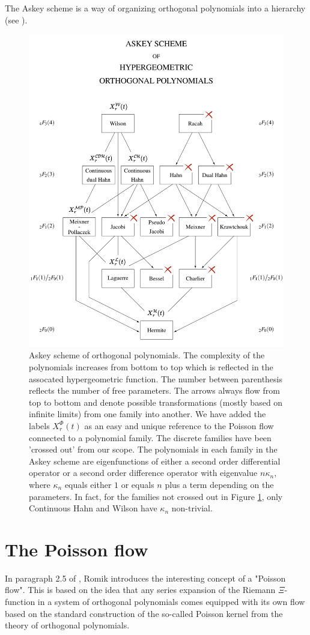 \documentclass[a4paper,11pt,twoside]{amsart}
\begin{document}
The Askey scheme is a way of organizing orthogonal polynomials into a hierarchy (see \cite{koe}).
\begin{figure}[H]
  \includegraphics[width=0.8\linewidth]{Askeyschemenew.jpeg}
  \caption{Askey scheme of orthogonal polynomials. The complexity of the polynomials increases from bottom to top which is reflected in the assocated hypergeometric function. The number between parenthesis reflects the number of free parameters. The arrows always flow from top to bottom and denote possible transformations (mostly based on infinite limits) from one family into another. We have added the labels $X_r^{\mathcal{\Phi}}(t)$ as an easy and unique reference to the Poisson flow connected to a polynomial family. The discrete families have been 'crossed out' from our scope. The polynomials in each family in the Askey scheme are eigenfunctions of either a second order differential operator or a second order difference operator with eigenvalue $n\kappa_n$, where $\kappa_n$ equals either $1$ or equals $n$ plus a term depending on the parameters. In fact, for the families not crossed out in Figure \ref{fig:askey}, only Continuous Hahn and Wilson have $\kappa_n$ non-trivial.}
  \label{fig:askey}
\end{figure}

\pagebreak
\section{The Poisson flow} \label{poissonflow}
In paragraph 2.5 of \cite{rom}, Romik introduces the interesting concept of a "Poisson flow". This is based on the idea that any series expansion of the Riemann $\Xi$-function in a system of orthogonal polynomials comes equipped with its own flow based on the standard construction of the so-called Poisson kernel from the theory of orthogonal polynomials. 
\end{document}
